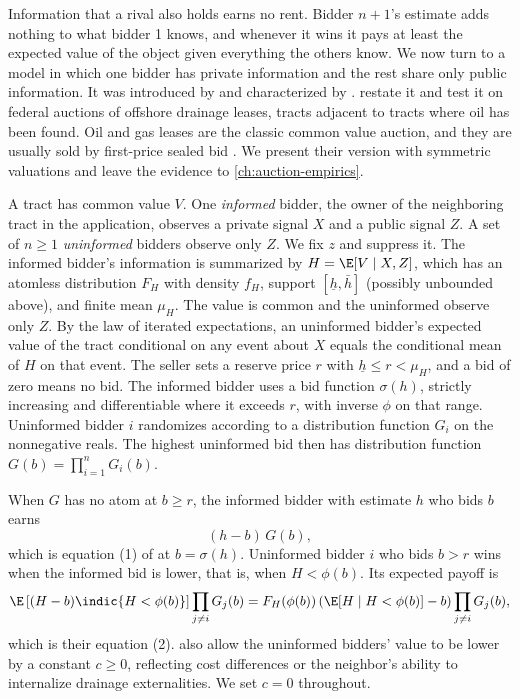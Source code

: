 Information that a rival also holds earns no rent. Bidder $n+1$'s estimate adds nothing to what bidder 1
knows, and whenever it wins it pays at least the expected value of the object given everything the
others know. We now turn to a model in which one bidder has private information and the rest share only
public information. It was introduced by \citet{Wilson1967} and characterized by
\citet{EngelbrechtWiggansMilgromWeber1983}. \citet{HendricksPorter1988} restate it and test it on federal
auctions of offshore drainage leases, tracts adjacent to tracts where oil has been found. Oil and gas leases
are the classic common value auction, and they are usually sold by first-price sealed bid
\citep[Section~4, p.~124]{HortacsuPerrigne2021}. We present their
version with symmetric valuations and leave the evidence to \cref{ch:auction-empirics}.

 A tract has common value $V$. One \emph{informed} bidder, the owner of the
neighboring tract in the application, observes a private signal $X$ and a public signal $Z$. A set of $n\ge
1$ \emph{uninformed} bidders observe only $Z$. We fix $z$ and suppress it. The informed bidder's information
is summarized by $H=\E[V\mid X,Z]$, which has an atomless distribution $F_H$ with density $f_H$, support
$[\underline h,\bar h]$ (possibly unbounded above), and finite mean $\mu_H$. The value is common and the
uninformed observe only $Z$. By the law of iterated expectations, an uninformed bidder's expected value of
the tract conditional on any event about $X$ equals the conditional mean of $H$ on that event. The seller
sets a reserve price $r$ with $\underline h\le r<\mu_H$, and a bid of zero means no bid. The informed bidder
uses a bid function $\sigma(h)$, strictly increasing and differentiable where it exceeds $r$, with inverse
$\phi$ on that range. Uninformed bidder $i$ randomizes according to a distribution function $G_i$ on the
nonnegative reals. The highest uninformed bid then has distribution function $G(b)=\prod_{i=1}^nG_i(b)$.

When $G$ has no atom at $b\ge r$, the informed bidder with estimate $h$ who bids $b$ earns
\begin{equation}\label{eq:14-hp-informed}
  (h-b)\,G(b),
\end{equation}
which is equation (1) of \citet{HendricksPorter1988} at $b=\sigma(h)$. Uninformed bidder $i$ who bids $b>r$
wins when the informed bid is lower, that is, when $H<\phi(b)$. Its expected payoff is
\begin{equation}\label{eq:14-hp-uninformed}
  \E\left[(H-b)\indic\{H<\phi(b)\}\right]\prod_{j\ne i}G_j(b)
  =F_H(\phi(b))\left(\E[H\mid H<\phi(b)]-b\right)\prod_{j\ne i}G_j(b),
\end{equation}
which is their equation (2). \citet{HendricksPorter1988} also allow the uninformed bidders' value to be
lower by a constant $c\ge0$, reflecting cost differences or the neighbor's ability to internalize drainage
externalities. We set $c=0$ throughout.

